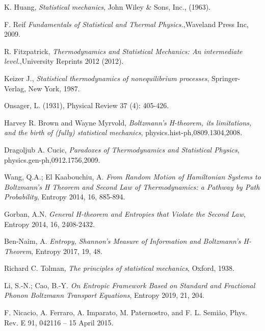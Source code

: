 \documentclass{article}
\begin{document}
\begin{thebibliography}{}


K. Huang, \emph{Statistical mechanics}, John Wiley \& Sons, Inc., (1963).

F. Reif {\it Fundamentals of Statistical and Thermal Physics.},Waveland Press Inc, 2009.

R. Fitzpatrick, {\it Thermodynamics and Statistical Mechanics: An intermediate level.},University Reprints 2012 (2012).

Keizer J., \emph{Statistical thermodynamics of nonequilibrium processes}, Springer-Verlag, New York, 1987.

Onsager, L. (1931), Physical Review 37 (4): 405-426.

Harvey R. Brown and Wayne Myrvold, {\it Boltzmann's H-theorem, its limitations, and the birth of (fully) statistical mechanics}, physics.hist-ph,0809.1304,2008.

Dragoljub A. Cucic, {\it Paradoxes of Thermodynamics and Statistical Physics}, physics.gen-ph,0912.1756,2009.

Wang, Q.A.; El Kaabouchiu, A. {\it From Random Motion of Hamiltonian Systems to Boltzmann’s H Theorem and Second Law of Thermodynamics: a Pathway by Path Probability}, Entropy 2014, 16, 885-894.

Gorban, A.N. {\it General H-theorem and Entropies that Violate the Second Law}, Entropy 2014, 16, 2408-2432.

Ben-Naim, A. {\it Entropy, Shannon’s Measure of Information and Boltzmann’s H-Theorem}, Entropy 2017, 19, 48.

 Richard C. Tolman, \emph{The principles of statistical mechanics}, Oxford, 1938.

Li, S.-N.; Cao, B.-Y. {\it On Entropic Framework Based on Standard and Fractional Phonon Boltzmann Transport Equations}, Entropy 2019, 21, 204.


F. Nicacio, A. Ferraro, A. Imparato, M. Paternostro, and F. L. Semião,
Phys. Rev. E 91, 042116 – 15 April 2015.


\end{thebibliography}
\end{document}
